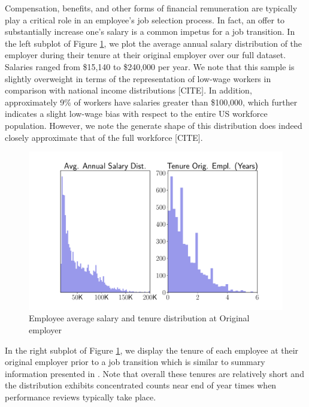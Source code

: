 \documentclass[10pt]{article}
\begin{document}
Compensation, benefits, and other forms of financial remuneration are typically play 
a critical role in an employee's job selection process.  In fact, an offer to 
substantially increase one's salary is a common impetus for a job transition. 
In the left subplot of Figure \ref{fig:avgsal}, we plot the average 
annual salary distribution 
of the employer during their tenure at their original employer over our full dataset.  
Salaries ranged from \$15,140 to \$240,000 per year.  We note that this sample 
is slightly overweight in terms of the representation of low-wage workers 
in comparison with national income distributions [CITE]. In addition, 
approximately 9\% of workers have salaries greater than \$100,000, which further 
indicates a slight low-wage bias with respect to the entire US workforce population. 
However, we note the generate shape of this distribution does indeed closely approximate 
that of the full workforce [CITE].
%
\begin{figure}[thb]
    \centering
	\includegraphics[width=1.0\linewidth]{avgsal.pdf}
	\caption{Employee average salary and tenure distribution at Original employer}
	\label{fig:avgsal}
\end{figure}
%
In the right subplot of Figure \ref{fig:avgsal}, we display the tenure of each 
employee at their original employer prior to a job transition which is similar to
summary information presented in \cite{Smart2016}. Note that overall these tenures 
are relatively short and the distribution exhibits concentrated counts near end of year 
times when performance reviews typically take place.  
\end{document}
